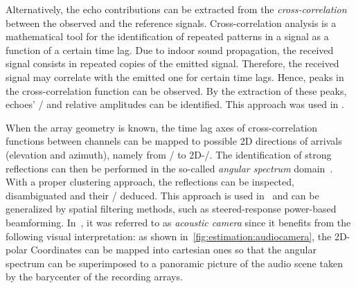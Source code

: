 \mynewline
Alternatively, the echo contributions can be extracted from the \textit{cross-correlation} between the observed and the reference signals.
Cross-correlation analysis is a mathematical tool for the identification of repeated patterns in a signal as a function of a certain time lag.
Due to indoor sound propagation, the received signal consists in repeated copies of the emitted signal.
Therefore, the received signal may correlate with the emitted one for certain time lags.
Hence, peaks in the cross-correlation function can be observed.
By the extraction of these peaks, echoes' \TOAs/ and relative amplitudes can be identified.
This approach was used in .

When the array geometry is known, the time lag axes of cross-correlation functions between channels can be mapped to possible 2D directions of arrivals (elevation and azimuth), namely from \TOAs/ to 2D-\DOAs/.
The identification of strong reflections can then be performed in the so-called \textit{angular spectrum} domain~.
With a proper clustering approach, the reflections can be inspected, disambiguated and their \TOAs/ deduced.
This approach is used in~ and can be generalized by spatial filtering methods, such as steered-response power-based beamforming.
In~, it was referred to as \textit{acoustic camera} since it benefits from the following visual interpretation:
as shown in~\cref{fig:estimation:audiocamera}, the 2D-polar Coordinates can be mapped into cartesian ones so that the angular spectrum can be superimposed to a panoramic picture of the audio scene taken by the barycenter of the recording arrays.

